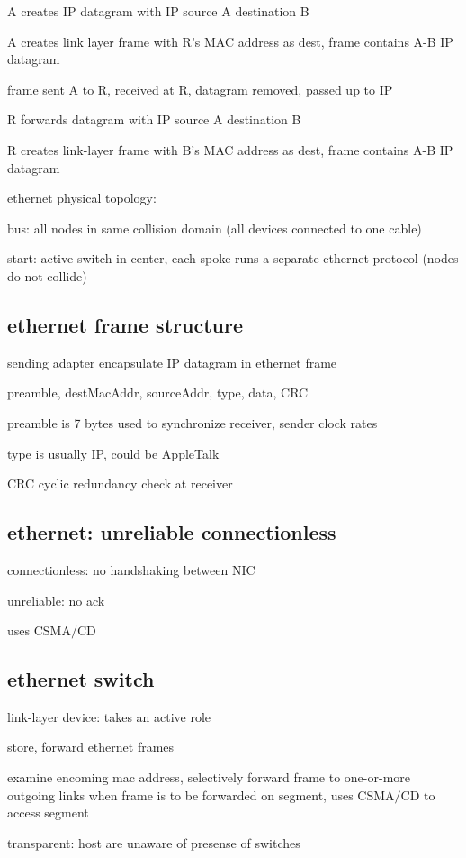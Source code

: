 \documentclass[10pt]{article}
\theoremstyle{break}
\begin{document}
A creates IP datagram with IP source A destination B

A creates link layer frame with R's MAC address as dest, frame contains A-B IP datagram 

frame sent A to R, received at R, datagram removed, passed up to IP 

R forwards datagram with IP source A destination B

R creates link-layer frame with B's MAC address as dest, frame contains A-B IP datagram

ethernet physical topology: 

bus: all nodes in same collision domain (all devices connected to one cable)

start: active switch in center, each spoke runs a separate ethernet protocol (nodes do not collide)

\subsection{ethernet frame structure}
sending adapter encapsulate IP datagram in ethernet frame 

preamble, destMacAddr, sourceAddr, type, data, CRC 

preamble is 7 bytes used to synchronize receiver, sender clock rates 

type is usually IP, could be AppleTalk 

CRC cyclic redundancy check at receiver

\subsection{ethernet: unreliable connectionless}
connectionless: no handshaking between NIC 

unreliable: no ack 

uses CSMA$/$CD

\subsection{ethernet switch}
link-layer device: takes an active role 

store, forward ethernet frames

examine encoming mac address, selectively forward frame to one-or-more outgoing links when 
frame is to be forwarded on segment, uses CSMA$/$CD to access segment

transparent: host are unaware of presense of switches 
\end{document}
